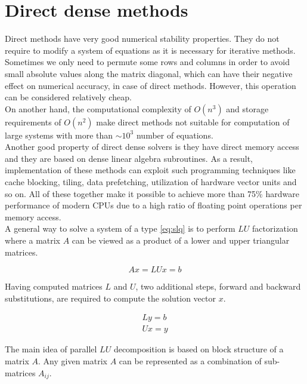 \section{Direct dense methods} \label{subseq:direct methods}
Direct methods have very good numerical stability properties. They do not require to modify a system of equations as it is necessary for iterative methods. Sometimes we only need to permute some rows and columns in order to avoid small absolute values along the matrix diagonal, which can have their negative effect on numerical accuracy, in case of direct methods. However, this operation can be considered relatively cheap. \\

On another hand, the computational complexity of $O(n^3)$ and storage requirements of $O(n^2)$ make direct methods not suitable for computation of large systems with more than $\sim 10^3$ number of equations. \\


Another good property of direct dense solvers is they have direct memory access and they are based on dense linear algebra subroutines. As a result, implementation of these methods can exploit such programming techniques like cache blocking, tiling, data prefetching,  utilization of hardware vector units and so on. All of these together make it possible to achieve more than 75\% hardware performance of modern CPUs \cite{articles:blas-performance} due to a high ratio of floating point operations per memory access. \\

A general way to solve a system of a type \ref{eq:slq} is to perform $LU$ factorization where a matrix $A$ can be viewed as a product of a lower and upper triangular matrices. 

\begin{equation} \label{eq:lu}
	Ax = LUx = b
\end{equation}

Having computed matrices $L$ and $U$, two additional steps, forward and backward substitutions, are required to compute the solution vector $x$.

\begin{align} \label{eq:bk}
	Ly = b \\
	Ux = y
\end{align}

The main idea of parallel $LU$ decomposition is based on block structure of a matrix $A$. Any given matrix $A$ can be represented as a combination of sub-matrices $A_{ij}$.

